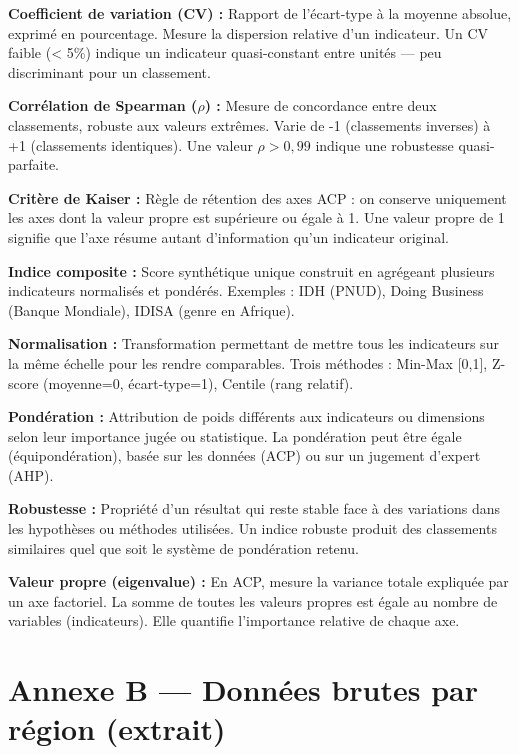 \documentclass[
]{article}
\begin{document}
\textbf{Coefficient de variation (CV) :} Rapport de l'écart-type à la
moyenne absolue, exprimé en pourcentage. Mesure la dispersion relative
d'un indicateur. Un CV faible (\textless{} 5\%) indique un indicateur
quasi-constant entre unités --- peu discriminant pour un classement.

\textbf{Corrélation de Spearman (\(\rho\)) :} Mesure de concordance
entre deux classements, robuste aux valeurs extrêmes. Varie de -1
(classements inverses) à +1 (classements identiques). Une valeur
\(\rho > 0{,}99\) indique une robustesse quasi-parfaite.

\textbf{Critère de Kaiser :} Règle de rétention des axes ACP : on
conserve uniquement les axes dont la valeur propre est supérieure ou
égale à 1. Une valeur propre de 1 signifie que l'axe résume autant
d'information qu'un indicateur original.

\textbf{Indice composite :} Score synthétique unique construit en
agrégeant plusieurs indicateurs normalisés et pondérés. Exemples : IDH
(PNUD), Doing Business (Banque Mondiale), IDISA (genre en Afrique).

\textbf{Normalisation :} Transformation permettant de mettre tous les
indicateurs sur la même échelle pour les rendre comparables. Trois
méthodes : Min-Max {[}0,1{]}, Z-score (moyenne=0, écart-type=1), Centile
(rang relatif).

\textbf{Pondération :} Attribution de poids différents aux indicateurs
ou dimensions selon leur importance jugée ou statistique. La pondération
peut être égale (équipondération), basée sur les données (ACP) ou sur un
jugement d'expert (AHP).

\textbf{Robustesse :} Propriété d'un résultat qui reste stable face à
des variations dans les hypothèses ou méthodes utilisées. Un indice
robuste produit des classements similaires quel que soit le système de
pondération retenu.

\textbf{Valeur propre (eigenvalue) :} En ACP, mesure la variance totale
expliquée par un axe factoriel. La somme de toutes les valeurs propres
est égale au nombre de variables (indicateurs). Elle quantifie
l'importance relative de chaque axe.

\newpage

\section*{Annexe B --- Données brutes par région
(extrait)}\label{annexe-b-donnuxe9es-brutes-par-ruxe9gion-extrait}
\end{document}

